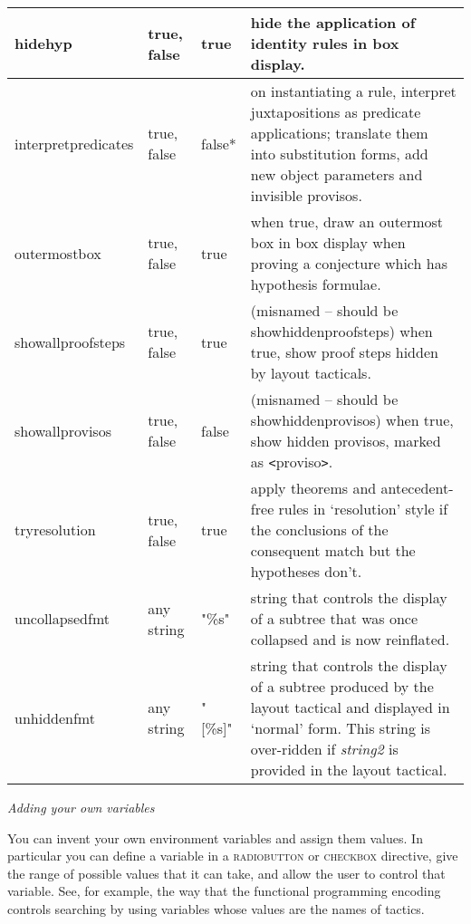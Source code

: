 \documentclass[11pt]{book}
\begin{document}
\begin{tabular}{|p{1.034in}|p{0.635in}|p{0.717in}|p{2.114in}|}
\hline
{\raggedright hidehyp} & {\raggedright true, false} & {\raggedright true} & {\raggedright hide the application of identity rules in box display.}\\
\hline
{\raggedright interpretpredicates} & {\raggedright true, false} & {\raggedright false*} & {\raggedright on instantiating a rule, interpret juxtapositions as predicate applications; translate them into substitution forms, add new object parameters and invisible provisos.}\\
\hline
{\raggedright outermostbox} & {\raggedright true, false} & {\raggedright true} & {\raggedright when true, draw an outermost box in box display when proving a conjecture which has hypothesis formulae.}\\
\hline
{\raggedright showallproofsteps} & {\raggedright true, false} & {\raggedright true} & {\raggedright (misnamed -- should be showhiddenproofsteps) when true, show proof steps hidden by layout tacticals.}\\
\hline
{\raggedright showallprovisos} & {\raggedright true, false} & {\raggedright false} & {\raggedright (misnamed -- should be showhiddenprovisos) when true, show hidden provisos, marked as \texttt{<}proviso\texttt{>}.}\\
\hline
{\raggedright tryresolution} & {\raggedright true, false} & {\raggedright true} & {\raggedright apply theorems and antecedent-free rules in `resolution' style if the conclusions of the consequent match but the hypotheses don't.}\\
\hline
{\raggedright uncollapsedfmt} & {\raggedright any string} & {\raggedright "\%s"} & {\raggedright string that controls the display of a subtree that was once collapsed and is now reinflated.}\\
\hline
{\raggedright unhiddenfmt} & {\raggedright any string} & {\raggedright "[\%s]"} & {\raggedright string that controls the display of a subtree produced by the layout tactical and displayed in `normal' form. This string is over-ridden if \textit{string2} is provided in the layout tactical.}\\
\hline \end{tabular}


\textit{Adding your own variables}


You can invent your own environment variables and assign them values. In particular you can define a variable in a \textsc{radiobutton} or \textsc{checkbox} directive, give the range of possible values that it can take, and allow the user to control that variable. See, for example, the way that the functional programming encoding controls searching by using variables whose values are the names of tactics.
\end{document}
